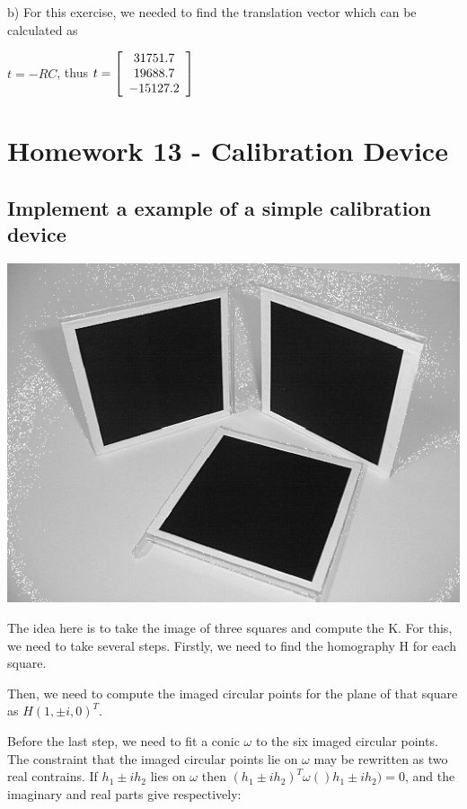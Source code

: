 \documentclass[]{article}
\begin{document}
b) For this exercise, we needed to find the translation vector which can be calculated as 

\centerline {
	$t = -RC$, thus $t =\left[ {\begin{array}{*{20}c}
		31751.7 \\
		19688.7 \\ 
		-15127.2   
		\end{array} } \right] $
}


\section{Homework 13 - Calibration Device }
\subsection{Implement a example of a simple calibration device}



\centerline {
	\includegraphics[scale=0.5]{squares}
}

The idea here is to take the image of three squares and compute the K. For this, we need to take several steps. Firstly, we need to find the homography H for each square. 

Then, we need to compute the imaged circular points for the plane of that square as $H(1, \pm i, 0)^T$. 


Before the last step, we need to fit a conic $\omega$ to the six imaged circular points. The constraint that the imaged circular points lie on $\omega$ may be rewritten as two real contrains. If $h_1 \pm ih_2$ lies on $\omega$ then $(h_1 \pm ih_2)^T \omega ()h_1 \pm ih_2) = 0$, and the imaginary and real parts give respectively: 
\end{document}
